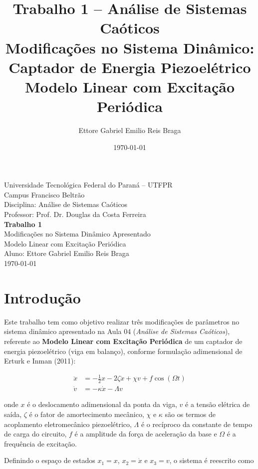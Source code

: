 \documentclass[a4paper,11pt]{article}
\title{\textbf{Trabalho 1 -- Análise de Sistemas Caóticos} \\[0.3cm]
\large Modificações no Sistema Dinâmico: Captador de Energia Piezoelétrico \\
Modelo Linear com Excitação Periódica}
\author{Ettore Gabriel Emilio Reis Braga}
\date{\today}
\begin{document}
\begin{titlepage}
\centering
\vspace*{1cm}
{\large Universidade Tecnológica Federal do Paraná -- UTFPR}\\
{\large Campus Francisco Beltrão}\\[0.3cm]
{\large Disciplina: Análise de Sistemas Caóticos}\\
{\large Professor: Prof. Dr. Douglas da Costa Ferreira}\\[3cm]

{\Huge \textbf{Trabalho 1}}\\[0.5cm]
{\Large Modificações no Sistema Dinâmico Apresentado}\\[0.3cm]
{\large Modelo Linear com Excitação Periódica}\\[3cm]

{\large Aluno: Ettore Gabriel Emilio Reis Braga}\\[0.3cm]
{\large \today}

\vfill
\end{titlepage}

\section{Introdução}

Este trabalho tem como objetivo realizar três modificações de parâmetros no
sistema dinâmico apresentado na Aula 04 (\emph{Análise de Sistemas Caóticos}),
referente ao \textbf{Modelo Linear com Excitação Periódica} de um captador de
energia piezoelétrico (viga em balanço), conforme formulação adimensional de
Erturk e Inman (2011):

\begin{align}
\ddot{x} &= -\frac{1}{2}x - 2\zeta \dot{x} + \chi v + f\cos(\Omega t) \\
\dot{v}  &= -\kappa \dot{x} - \Lambda v
\end{align}

onde $x$ é o deslocamento adimensional da ponta da viga, $v$ é a tensão
elétrica de saída, $\zeta$ é o fator de amortecimento mecânico, $\chi$ e
$\kappa$ são os termos de acoplamento eletromecânico piezoelétrico,
$\Lambda$ é o recíproco da constante de tempo de carga do circuito, $f$ é a
amplitude da força de aceleração da base e $\Omega$ é a frequência de
excitação.

Definindo o espaço de estados $x_1=x$, $x_2=\dot x$ e $x_3=v$, o sistema é
reescrito como
\end{document}
